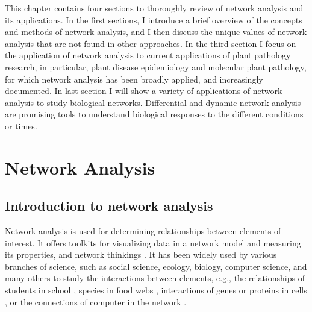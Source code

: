 
This chapter contains four sections to thoroughly review of network analysis and its applications. In the first sections, I introduce a brief overview of the concepts and methods of network analysis, and I then discuss the unique values of network analysis that are not found in other approaches. In the third section I focus on the application of network analysis to current applications of plant pathology research, in particular, plant disease epidemiology and molecular plant pathology, for which network analysis has been broadly applied, and increasingly documented. In last section I will show a variety of applications of network analysis to study biological networks. Differential and dynamic network analysis are promising tools to understand biological responses to the different conditions or times.



\section*{Network Analysis}
\subsection*{Introduction to network analysis}

Network analysis is used for determining relationships between elements of interest. It offers toolkits for visualizing data in a network model and measuring its properties, and network thinkings \citep{PROULX:2005hx}. It has been widely used by various branches of science, such as social science, ecology, biology, computer science, and many others to study the interactions between elements, e.g., the relationships of students in school \citep{moody2001race}, species in food webs \citep{krause2003compartments}, interactions of genes or proteins in cells \citep{guimera2005functional}, or the connections of computer in the network \citep{pastor2001epidemic, newman2006modularity}.

